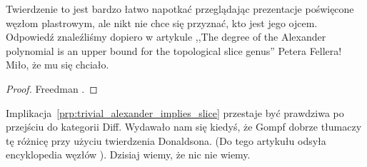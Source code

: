 Twierdzenie to jest bardzo łatwo napotkać przeglądając prezentacje poświęcone węzłom plastrowym, ale nikt nie chce się przyznać, kto jest jego ojcem.
Odpowiedź znaleźliśmy dopiero w artykule ,,The degree of the Alexander polynomial is an upper bound for the topological slice genus'' Petera Fellera!
Miło, że mu się chciało.

\begin{proof}
%
    Freedman \cite[tw. 1.13]{freedman1982}.
\end{proof}

Implikacja~\ref{prp:trivial_alexander_implies_slice} przestaje być prawdziwa po przejściu do kategorii Diff.
Wydawało nam się kiedyś, że Gompf \cite{gompf1986} dobrze tłumaczy tę różnicę przy użyciu twierdzenia Donaldsona.
%
%
(Do tego artykułu odsyła encyklopedia węzłów \cite{adams2021}).
Dzisiaj wiemy, że nic nie wiemy.









